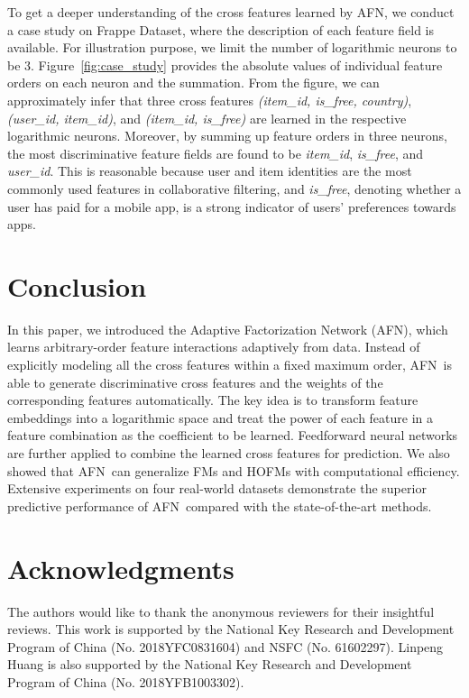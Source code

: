 \documentclass[letterpaper]{article} \usepackage{aaai20}  \usepackage{times}  \usepackage{helvet} \usepackage{courier}  \usepackage[hyphens]{url}  \usepackage{graphicx} \urlstyle{rm} \def\UrlFont{\rm}  \usepackage{graphicx}  \frenchspacing  \setlength{\pdfpagewidth}{8.5in}  \setlength{\pdfpageheight}{11in}
\newcommand{\model}{{AFN}~}
\newcommand{\modelns}{{AFN}}
\begin{document}
To get a deeper understanding of the cross features learned by \modelns, we conduct a case study on Frappe Dataset, where the description of each feature field is available. For illustration purpose, we limit the number of logarithmic neurons to be $3$. Figure~\ref{fig:case_study} provides the absolute values of individual feature orders on each neuron and the summation. From the figure, we can approximately infer that three cross features \emph{(item\_id, is\_free, country)}, \emph{(user\_id, item\_id)}, and \emph{(item\_id, is\_free)} are learned in the respective logarithmic neurons. Moreover, by summing up feature orders in three neurons, the most discriminative feature fields are found to be \emph{item\_id}, \emph{is\_free}, and \emph{user\_id}. This is reasonable because user and item identities are the most commonly used features in collaborative filtering, and \emph{is\_free}, denoting whether a user has paid for a mobile app, is a strong indicator of users' preferences towards apps.
 
 
\section{Conclusion}

In this paper, we introduced the Adaptive Factorization Network (\modelns), which learns arbitrary-order feature interactions adaptively from data. Instead of explicitly modeling all the cross features within a fixed maximum order, \model is able to generate discriminative cross features and the weights of the corresponding features automatically.
The key idea is to transform feature embeddings into a logarithmic space and treat the power of each feature in a feature combination as the coefficient to be learned. 
Feedforward neural networks are further applied to combine the learned cross features for prediction. 
We also showed that \model can generalize FMs and HOFMs with computational efficiency. Extensive experiments on four real-world datasets demonstrate the superior predictive performance of \model compared with the state-of-the-art methods.

\section*{Acknowledgments}
The authors would like to thank the anonymous reviewers for their
insightful reviews.
This work is supported by the National Key Research
and Development Program of China (No. 2018YFC0831604) and NSFC (No. 61602297). Linpeng Huang is also supported by the National Key Research
and Development Program of China (No. 2018YFB1003302).


 
\end{document}
